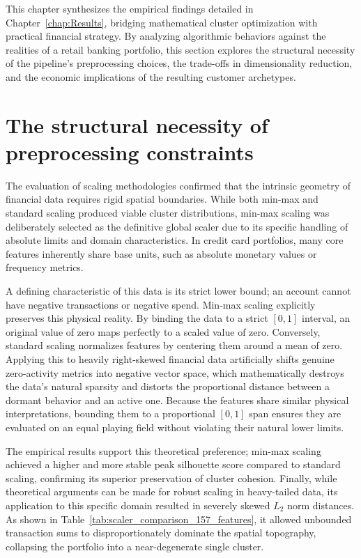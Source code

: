 This chapter synthesizes the empirical findings detailed in Chapter~\ref{chap:Results}, bridging mathematical cluster optimization with practical financial strategy.
By analyzing algorithmic behaviors against the realities of a retail banking portfolio, this section explores the structural necessity of the pipeline's preprocessing choices, the trade-offs in dimensionality reduction, and the economic implications of the resulting customer archetypes.
\section{The structural necessity of preprocessing constraints}

The evaluation of scaling methodologies confirmed that the intrinsic geometry of financial data requires rigid spatial boundaries. While both min-max and standard scaling produced viable cluster distributions, min-max scaling was deliberately selected as the definitive global scaler due to its specific handling of absolute limits and domain characteristics. In credit card portfolios, many core features inherently share base units, such as absolute monetary values or frequency metrics.

A defining characteristic of this data is its strict lower bound; an account cannot have negative transactions or negative spend. Min-max scaling explicitly preserves this physical reality. By binding the data to a strict $[0, 1]$ interval, an original value of zero maps perfectly to a scaled value of zero. Conversely, standard scaling normalizes features by centering them around a mean of zero. Applying this to heavily right-skewed financial data artificially shifts genuine zero-activity metrics into negative vector space, which mathematically destroys the data's natural sparsity and distorts the proportional distance between a dormant behavior and an active one. Because the features share similar physical interpretations, bounding them to a proportional $[0, 1]$ span ensures they are evaluated on an equal playing field without violating their natural lower limits.

The empirical results support this theoretical preference; min-max scaling achieved a higher and more stable peak silhouette score compared to standard scaling, confirming its superior preservation of cluster cohesion. Finally, while theoretical arguments can be made for robust scaling in heavy-tailed data, its application to this specific domain resulted in severely skewed $L_2$ norm distances. As shown in Table~\ref{tab:scaler_comparison_157_features}, it allowed unbounded transaction sums to disproportionately dominate the spatial topography, collapsing the portfolio into a near-degenerate single cluster.

